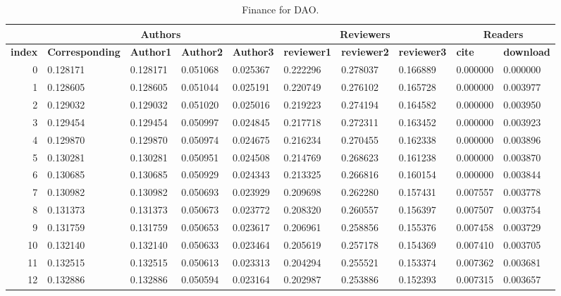 \documentclass[lettersize,journal]{IEEEtran}
\begin{document}
\begin{table}[ht!]
  \begin{center}
    \caption{Finance for DAO.}
    \label{tab:finance}
    \begin{tabular}{r|l|l|l|l|l|l|l|l|l} %
      & \multicolumn{4}{c}{\textbf{Authors}} & \multicolumn{3}{|c|}{\textbf{Reviewers}} & \multicolumn{2}{c}{\textbf{Readers}}\\
      \hline
      \textbf{index} & \textbf{Corresponding} & \textbf{Author1} & \textbf{Author2} & \textbf{Author3} & \textbf{reviewer1} & \textbf{reviewer2} & \textbf{reviewer3} & \textbf{cite} & \textbf{download}\\
      \hline
      0 & 0.128171 & 0.128171 & 0.051068 & 0.025367 & 0.222296 & 0.278037 & 0.166889 & 0.000000 & 0.000000 \\
      1 & 0.128605 & 0.128605 & 0.051044 & 0.025191 & 0.220749 & 0.276102 & 0.165728 & 0.000000 & 0.003977 \\
      2 & 0.129032 & 0.129032 & 0.051020 & 0.025016 & 0.219223 & 0.274194 & 0.164582 & 0.000000 & 0.003950 \\
      3 & 0.129454 & 0.129454 & 0.050997 & 0.024845 & 0.217718 & 0.272311 & 0.163452 & 0.000000 & 0.003923 \\
      4 & 0.129870 & 0.129870 & 0.050974 & 0.024675 & 0.216234 & 0.270455 & 0.162338 & 0.000000 & 0.003896 \\
      5 & 0.130281 & 0.130281 & 0.050951 & 0.024508 & 0.214769 & 0.268623 & 0.161238 & 0.000000 & 0.003870 \\
      6 & 0.130685 & 0.130685 & 0.050929 & 0.024343 & 0.213325 & 0.266816 & 0.160154 & 0.000000 & 0.003844 \\
      7 & 0.130982 & 0.130982 & 0.050693 & 0.023929 & 0.209698 & 0.262280 & 0.157431 & 0.007557 & 0.003778 \\
      8 & 0.131373 & 0.131373 & 0.050673 & 0.023772 & 0.208320 & 0.260557 & 0.156397 & 0.007507 & 0.003754 \\
      9 & 0.131759 & 0.131759 & 0.050653 & 0.023617 & 0.206961 & 0.258856 & 0.155376 & 0.007458 & 0.003729 \\
      10 & 0.132140 & 0.132140 & 0.050633 & 0.023464 & 0.205619 & 0.257178 & 0.154369 & 0.007410 & 0.003705 \\
      11 & 0.132515 & 0.132515 & 0.050613 & 0.023313 & 0.204294 & 0.255521 & 0.153374 & 0.007362 & 0.003681 \\
      12 & 0.132886 & 0.132886 & 0.050594 & 0.023164 & 0.202987 & 0.253886 & 0.152393 & 0.007315 & 0.003657 \\

\end{tabular}
\end{center}
\end{table}
\end{document}
